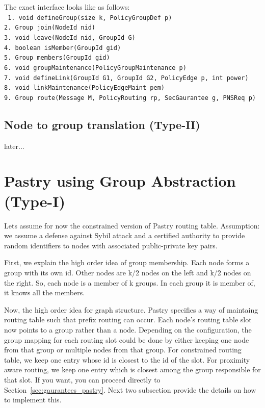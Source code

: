 The exact interface looks like as follows:\\
\texttt{
1. void defineGroup(size k, PolicyGroupDef p)\\
2. Group join(NodeId nid) \\
3. void leave(NodeId nid, GroupId G) \\
4. boolean isMember(GroupId gid) \\
5. Group members(GroupId gid) \\
6. void groupMaintenance(PolicyGroupMaintenance p)\\
7. void defineLink(GroupId G1, GroupId G2, PolicyEdge p, int power) \\
8. void linkMaintenance(PolicyEdgeMaint pem) \\
9. Group route(Message M, PolicyRouting rp, SecGaurantee g, PNSReq p)\\
}

\subsection{Node to group translation (Type-II)}
later...

\section{Pastry using Group Abstraction (Type-I)}
Lets assume for now the constrained version of Pastry routing table.
Assumption: we assume a defense against Sybil attack and a certified authority to provide random identifiers to nodes with associated public-private key pairs.

First, we explain the high order idea of group membership. Each node forms a group with its own id. Other nodes are k/2 nodes on the left and k/2 nodes on the right. So, each node is a member of k groups. In each group it is member of, it knows all the members. 

Now, the high order idea for graph structure. Pastry specifies a way of maintaing routing table such that prefix routing can occur. Each node's routing table slot now points to a group rather than a node. Depending on the configuration, the group mapping for each routing slot could be done by either keeping one node from that group or multiple nodes from that group. For constrained routing table, we keep one entry whose id is closest to the id of the slot. For proximity aware routing, we keep one entry which is closest among the group responsible for that slot. If you want, you can proceed directly to Section~\ref{sec:gaurantees_pastry}. Next two subsection provide the details on how to implement this.

